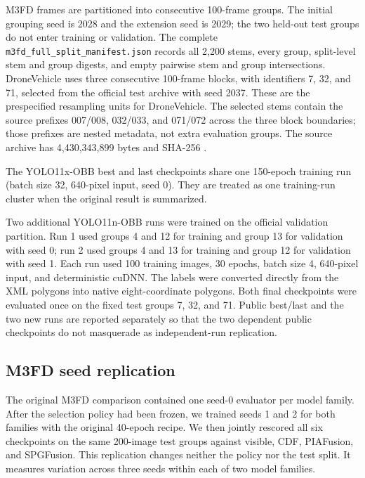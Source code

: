 \documentclass[11pt]{article}
\begin{document}
M3FD frames are partitioned into consecutive 100-frame groups. The initial
grouping seed is 2028 and the extension seed is 2029; the two held-out test
groups do not enter training or validation. The complete
\texttt{m3fd\_full\_split\_manifest.json} records all 2,200 stems, every group,
split-level stem and group digests, and empty pairwise stem and group
intersections. DroneVehicle uses three consecutive
100-frame blocks, with identifiers 7, 32, and 71, selected from the official
test archive with seed 2037. These are the prespecified resampling units for
DroneVehicle. The selected stems contain the source prefixes
007/008, 032/033, and 071/072 across the three block boundaries; those
prefixes are nested metadata, not extra evaluation groups. The source archive
has 4,430,343,899 bytes and SHA-256
\texttt{}.

The YOLO11x-OBB best and last checkpoints share one 150-epoch training run
(batch size 32, 640-pixel input, seed 0). They are treated as one training-run
cluster when the original result is summarized.

Two additional YOLO11n-OBB runs were trained on the official validation
partition. Run 1 used groups 4 and 12 for training and group 13 for validation
with seed 0; run 2 used groups 4 and 13 for training and group 12 for
validation with seed 1. Each run used 100 training images, 30 epochs, batch
size 4, 640-pixel input, and deterministic cuDNN. The labels were converted
directly from the XML polygons into native eight-coordinate polygons. Both
final checkpoints were evaluated once on the fixed test groups 7, 32, and 71.
Public best/last and the two new runs are reported separately so that the two
dependent public checkpoints do not masquerade as independent-run replication.

\subsection{M3FD seed replication}

The original M3FD comparison contained one seed-0 evaluator per model family.
After the selection policy had been frozen, we trained seeds 1 and 2 for both
families with the original 40-epoch recipe. We then jointly rescored all six
checkpoints on the same 200-image test groups against visible, CDF, PIAFusion,
and SPGFusion. This replication changes neither the policy nor the test split.
It measures variation across three seeds within each of two model families.
\end{document}
